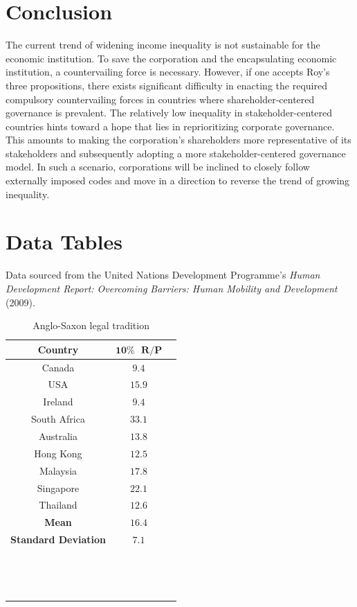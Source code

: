 \documentclass[12pt]{article}
\begin{document}
\section{\large Conclusion}
The current trend of widening income inequality is not sustainable for the economic institution. To save the corporation and the encapsulating economic institution, a countervailing force is necessary. However, if one accepts Roy's three propositions, there exists significant difficulty in enacting the required compulsory countervailing forces in countries where shareholder-centered governance is prevalent. The relatively low inequality in stakeholder-centered countries hints toward a hope that lies in reprioritizing corporate governance. This amounts to making the corporation's shareholders more representative of its stakeholders and subsequently adopting a more stakeholder-centered governance model. In such a scenario, corporations will be inclined to closely follow externally imposed codes and move in a direction to reverse the trend of growing inequality. 
\pagebreak


\newpage
\appendix

\section{Data Tables}
Data sourced from the United Nations Development Programme's \textit{Human Development Report: Overcoming Barriers: Human Mobility and Development} (2009).
\begin{table}[htbp!]
	\caption{Anglo-Saxon legal tradition}
	\centering
		\begin{tabular}{ccc}
			\textbf{Country} & $\mathbf{10\% \text{ } R/P}$ &\\
			  \hline
			Canada&$9.4$\\
			USA&$15.9$\\
			Ireland&$9.4$\\
			South Africa&$33.1$\\
			Australia&$13.8$\\
            Hong Kong&$12.5$\\
            Malaysia&$17.8$\\
            Singapore&$22.1$\\
            Thailand&$12.6$\\
            \hline
            \textbf{Mean}&$\mathbf{16.4}$\\
            \textbf{Standard Deviation}&$\mathbf{7.1}$\\
			\hline
            $ $ & $ $ \\
            $ $ & $ $ \\
            $ $ & $ $ 
		\end{tabular}
\end{table}
\end{document}
